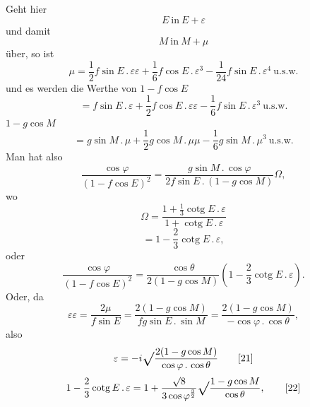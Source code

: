 \noindent\hspace*{\parindent}Geht hier
\[E\ \text{in}\ E+\varepsilon\]
\noindent und damit
\[M\ \text{in}\ M+\mu\]
\noindent über, so ist
\begin{equation}\mu=\frac12 f\sin E\,{.}\,\varepsilon\varepsilon+\frac16 f\cos E\,{.}\,\varepsilon^3-\frac1{24}f\sin E\,{.}\,\varepsilon^4\ \text{u.s.w.}\tag*{[13]}\end{equation}
\noindent und es werden die Werthe von \(1-f\cos E\)
\begin{equation}=f\sin E\,{.}\,\varepsilon+\frac12 f\cos E\,{.}\,\varepsilon\varepsilon-\frac16 f\sin E\,{.}\,\varepsilon^3\ \text{u.s.w.}\tag*{[14]}\end{equation}
 \(1-g\cos M\)
\begin{equation}=g\sin M\,{.}\,\mu+\frac12 g\cos M\,{.}\,\mu\mu-\frac16 g\sin M\,{.}\,\mu^3\ \text{u.s.w.}\tag*{[15]}\end{equation}
\noindent\hspace*{\parindent}Man hat also
\begin{equation}\frac{\cos\varphi}{(1-f\cos E)^2}=\frac{g\sin M\,{.}\,\cos\varphi}{2f\sin E\,{.}\,(1-g\cos M)}\Omega,\tag*{[16]}\end{equation}
\noindent wo
\begin{equation}\Omega=\frac{1+\tfrac13\operatorname{cotg}E\,{.}\,\varepsilon}{1+\operatorname{cotg}E\,{.}\,\varepsilon}\tag*{[17]}\end{equation}
\begin{equation}=1-\frac23\operatorname{cotg}E\,{.}\,\varepsilon,\tag*{[18]}\end{equation}
\noindent oder
\begin{equation}\frac{\cos\varphi}{(1-f\cos E)^2}=\frac{\cos\theta}{2(1-g\cos M)}\left(1-\frac23\operatorname{cotg}E\,{.}\,\varepsilon\right).\tag*{[19]}\end{equation}
\noindent Oder, da
\clearpage{}
\begin{equation}\varepsilon\varepsilon=\frac{2\mu}{f\sin E}=\frac{2(1-g\cos M)}{fg\sin E\,{.}\,\sin M}=\frac{2(1-g\cos M)}{-\cos\varphi\,{.}\,\cos\theta},\tag*{[20]}\end{equation}
\noindent also
\begin{equation}\varepsilon=-i\vsroot{\frac{2(1-g\cos M)}{\cos\varphi\,{.}\,\cos\theta}}\tag*{[21]}\end{equation}
\begin{equation}1-\frac23\operatorname{cotg}E\,{.}\,\varepsilon=1+\frac{\surd8}{3\cos\varphi^{\frac32}}\vsroot{\frac{1-g\cos M}{\cos\theta}},\tag*{[22]}\end{equation}
